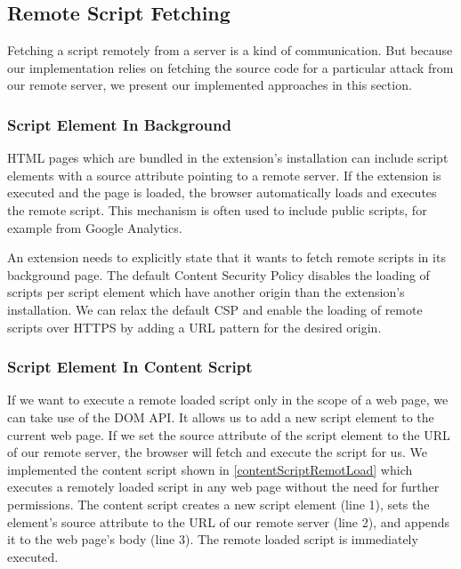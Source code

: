 \subsection{Remote Script Fetching}
		
	Fetching a script remotely from a server is a kind of communication. But because our implementation relies on fetching the source code for a particular attack from our remote server, we present our implemented approaches in this section.
	
\subsubsection{Script Element In Background}
	
	HTML pages which are bundled in the extension's installation can include script elements with a source attribute pointing to a remote server. If the extension is executed and the page is loaded, the browser automatically loads and executes the remote script. This mechanism is often used to include public scripts, for example from Google Analytics. 
	
	An extension needs to explicitly state that it wants to fetch remote scripts in its background page. The default Content Security Policy disables the loading of scripts per script element which have another origin than the extension's installation. We can relax the default CSP and enable the loading of remote scripts over HTTPS by adding a URL pattern for the desired origin. 
	
\subsubsection{Script Element In Content Script}

	If we want to execute a remote loaded script only in the scope of a web page, we can take use of the DOM API. It allows us to add a new script element to the current web page. If we set the source attribute of the script element to the URL of our remote server, the browser will fetch and execute the script for us. We implemented the content script shown in \autoref{contentScriptRemotLoad} which executes a remotely loaded script in any web page without the need for further permissions. The content script creates a new script element (line 1), sets the element's source attribute to the URL of our remote server (line 2), and appends it to the web page's body (line 3). The remote loaded script is immediately executed.
	
